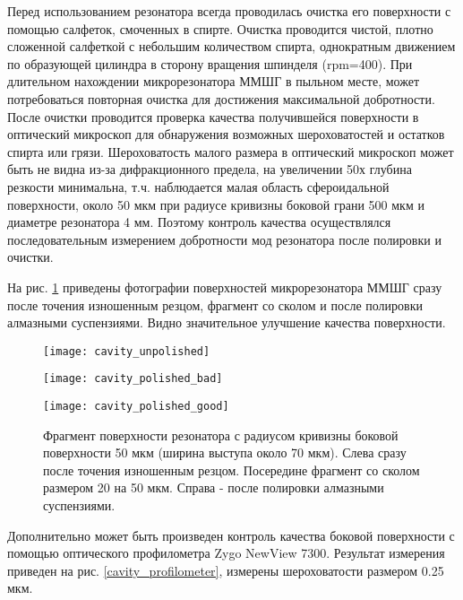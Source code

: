 Перед использованием резонатора всегда проводилась очистка его поверхности с помощью салфеток, смоченных в спирте. Очистка проводится чистой, плотно сложенной салфеткой с небольшим количеством спирта, однократным движением по образующей цилиндра в сторону вращения шпинделя (rpm=400). При длительном нахождении микрорезонатора ММШГ в пыльном месте, может потребоваться повторная очистка для достижения максимальной добротности. После очистки проводится проверка качества получившейся поверхности в оптический микроскоп для обнаружения возможных шероховатостей и остатков спирта или грязи. Шероховатость малого размера в оптический микроскоп может быть не видна из-за дифракционного предела, на увеличении 50х глубина резкости минимальна, т.ч. наблюдается малая область сфероидальной поверхности, около 50 мкм при радиусе кривизны боковой грани 500 мкм и диаметре резонатора 4 мм. Поэтому контроль качества осуществлялся последовательным измерением добротности мод резонатора после полировки и очистки.

На рис. \ref{cavity_polished} приведены фотографии поверхностей микрорезонатора ММШГ сразу после точения изношенным резцом, фрагмент со сколом и после полировки алмазными суспензиями. Видно значительное улучшение качества поверхности.

\begin{figure}[ht]
  \begin{minipage}[ht]{0.32\linewidth}\centering
    \texttt{[image: cavity\_unpolished]}
  \end{minipage}
  \hfill
  \begin{minipage}[ht]{0.32\linewidth}\centering
    \texttt{[image: cavity\_polished\_bad]}
  \end{minipage}
  \hfill
  \begin{minipage}[ht]{0.32\linewidth}\centering
    \texttt{[image: cavity\_polished\_good]}
  \end{minipage}
  \caption{Фрагмент поверхности резонатора с радиусом кривизны боковой поверхности 50 мкм (ширина выступа около 70 мкм). Слева сразу после точения изношенным резцом. Посередине фрагмент со сколом размером 20 на 50 мкм. Справа - после полировки алмазными суспензиями.}
  \label{cavity_polished}
\end{figure}

Дополнительно может быть произведен контроль качества боковой поверхности с помощью оптического профилометра Zygo NewView 7300. Результат измерения приведен на рис. \ref{cavity_profilometer}, измерены шероховатости размером 0.25 мкм.

